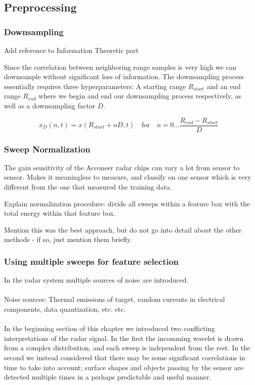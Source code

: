 \documentclass[a4paper, 12pt]{article}
\begin{document}
\subsection{Preprocessing}

\subsubsection{Downsampling}
Add reference to Information Theoretic part

Since the correlation between neighboring range samples is very high we can downsample without significant loss of information. The downsampling process essentially requires three hyperparameters: A starting range $R_{start}$ and an end range $R_{end}$ where we begin and end our downsampling process respectively, as well as a downsampling factor $D$.

\begin{equation}
	x_D(n, t) = x(R_{start} + nD, t) \quad \text{for}\quad n=0...\frac{R_{end}-R_{start}}{D}
\end{equation}

\subsubsection{Sweep Normalization}
The gain sensitivity of the Acconeer radar chips can vary a lot from sensor to sensor. Makes it meaningless to measure, and classify on one sensor which is very different from the one that measured the training data. 

Explain normalization procedure: divide all sweeps within a feature box with the total energy within that feature box. 

Mention this was the best approach, but do not go into detail about the other methods - if so, just mention them briefly.



\subsubsection{Using multiple sweeps for feature selection}

In the radar system multiple sources of noise are introduced.
\\ \\
Noise sources: Thermal emissions of target, random currents in electrical components, data quantization, etc. etc. \citep{w_doerry_2016}
\\ \\
In the beginning section of this chapter we introduced two conflicting interpretations of the radar signal. In the first the incomming wavelet is drawn from a complex distribution, and each sweep is independent from the rest. In the second we instead considered that there may be some significant correlations in time to take into account; surface shapes and objects passing by the sensor are detected multiple times in a perhaps predictable and useful manner.  
\end{document}
